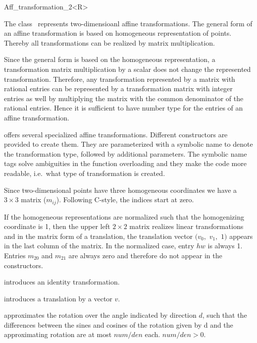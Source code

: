 \begin{ccRefClass}{Aff_transformation_2<R>}


\ccDefinition
The class \ccRefName\ represents two-dimensioanl affine transformations. 
The general form of an affine transformation is based on homogeneous
representation of points. Thereby all transformations can be realized by
matrix multiplication. 

Since the general form is based on the homogeneous representation, a
transformation matrix multiplication by a scalar does not change
the represented transformation. Therefore, any transformation represented
by a matrix with rational entries can be represented by a 
transformation matrix with integer entries as well by multiplying
the matrix with the common denominator of the rational entries. 
Hence it is sufficient to have number type  for the entries 
of an affine transformation.

{\cgal} offers several specialized affine transformations. 
Different constructors are provided to create them. 
They are parameterized with a symbolic name to
denote the transformation type, followed by additional parameters.
The symbolic name tags solve ambiguities in the function
overloading and they make the code more readable, i.e.\ what type
of transformation is created.

Since two-dimensional points have three 
homogeneous coordinates we have a $3\times 3$ matrix ($m_{ij}$).
Following C-style, the indices start at zero.

If the homogeneous representations are normalized such that the 
homogenizing coordinate is 1, then the upper left $2\times 2$ matrix realizes
linear transformations and in the matrix form of a translation,  the
translation vector $(v_0,$ $v_1,$ $1)$ appears in the last column of the 
matrix. In the normalized case, entry $hw$ is always 1.
Entries $m_{20}$ and $m_{21}$ are always zero and therefore do not appear in
the constructors.


\ccCreation
{}

            {introduces an identity transformation.}

            {introduces a translation by a vector $v$.}

            {approximates the rotation over the angle indicated by direction 
             $d$, such that the differences between the sines and cosines
             of the rotation given by d and the approximating rotation
             are at most $num/den$ each.
             \ccPrecond $num/den>0$. }


\end{ccRefClass}
